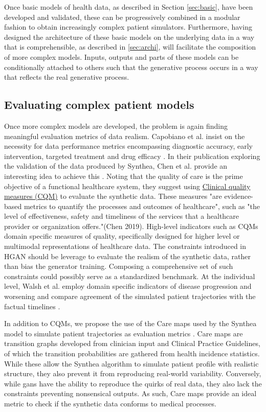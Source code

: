 Once basic models of health data, as described in Section \ref{sec:basic}, have been developed and validated, these can be progressively combined in a modular fashion to obtain increasingly complex patient simulators. Furthermore, having designed the architecture of these basic models on the underlying data in a way that is comprehensible, as described in \ref{sec:archi}, will facilitate the composition of more complex models. Inputs, outputs and parts of these models can be conditionally attached to others such that the generative process occurs in a way that reflects the real generative process.

\subsection{Evaluating complex patient models}
Once more complex models are developed, the problem is again finding meaningful evaluation metrics of data realism. Capobiano et al. insist on the necessity for data performance metrics encompassing diagnostic accuracy, early intervention, targeted treatment and drug efficacy \cite{Capobianco2020}. In their publication exploring the validation of the data produced by Synthea, Chen et al. provide an interesting idea to achieve this \cite{Chen_2019}. Noting that the quality of care is the prime objective of a functional healthcare system, they suggest using \hyperlink{CQM}{Clinical quality measures (CQM)} to evaluate the synthetic data. These measures "are evidence-based metrics to quantify the processes and outcomes of healthcare", such as "the level of effectiveness, safety and timeliness of the services that a healthcare provider or organization offers."(Chen 2019). High-level indicators such as \hypertarget{CQM}{CQMs} domain specific measures of quality, specifically designed for higher level or multimodal representations of healthcare data. The constraints introduced in HGAN should be leverage to evaluate the realism of the synthetic data, rather than bias the generator training. Composing a comprehensive set of such constraints could possibly serve as a standardized benchmark.
At the individual level, Walsh et al. employ domain specific indicators of disease progression and worsening and compare agreement of the simulated patient trajectories with the factual timelines \cite{walsh2020generating}.\par
In addition to \hypertarget{CQM}{CQMs}, we propose the use of the Care maps used by the Synthea model to simulate patient trajectories as evaluation metrics \cite{Walonoski_2017}. Care maps are transition graphs developed from clinician input and Clinical Practice Guidelines, of which the transition probabilities are gathered from health incidence statistics. While these allow the Synthea algorithm to simulate patient profile with realistic structure, they also prevent it from reproducing real-world variability. Conversely, while \glspl{gan} have the ability to reproduce the quirks of real data, they also lack the constraints preventing nonsensical outputs. As such, Care maps provide an ideal metric to check if the synthetic data conforms to medical processes.\par 

